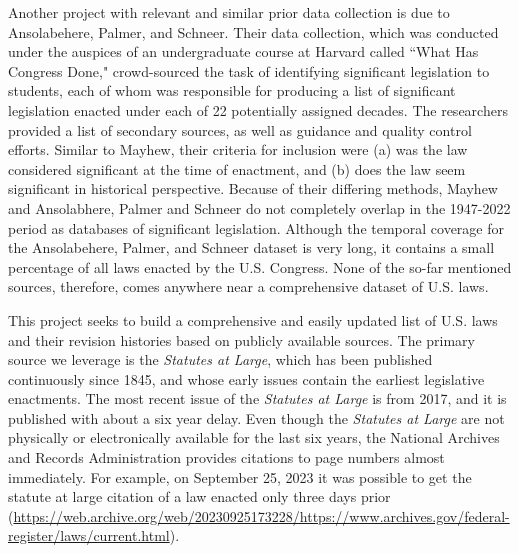 \documentclass[fleqn,10pt]{wlscirep}
\begin{document}
Another project with relevant and similar prior data collection is due to Ansolabehere, Palmer, and Schneer.\cite{ansolabehere_palmer_schneer_2016,ansolabehere2018divided} Their data collection, which was conducted under the auspices of an undergraduate course at Harvard called ``What Has Congress Done," crowd-sourced the task of identifying significant legislation to students, each of whom was responsible for producing a list of significant legislation enacted under each of 22 potentially assigned decades. The researchers provided a list of secondary sources, as well as guidance and quality control efforts. Similar to Mayhew, their criteria for inclusion were (a) was the law considered significant at the time of enactment, and (b) does the law seem significant in historical perspective. Because of their differing methods, Mayhew and Ansolabhere, Palmer and Schneer do not completely overlap in the 1947-2022 period as databases of significant legislation. Although the temporal coverage for the Ansolabehere, Palmer, and Schneer dataset is very long, it contains a small percentage of all laws enacted by the U.S. Congress. None of the so-far mentioned sources, therefore, comes anywhere near a comprehensive dataset of U.S. laws. 


This project seeks to build a comprehensive and easily updated list of U.S. laws and their revision histories based on publicly available sources. The primary source we leverage is the \emph{Statutes at Large}, which has been published continuously since 1845, and whose early issues contain the earliest legislative enactments. The most recent issue of the \emph{Statutes at Large} is from 2017, and it is published with about a six year delay. Even though the \emph{Statutes at Large} are not physically or electronically available for the last six years, the National Archives and Records Administration provides citations to page numbers almost immediately. For example, on September 25, 2023 it was possible to get the statute at large citation of a law enacted only three days prior (\url{https://web.archive.org/web/20230925173228/https://www.archives.gov/federal-register/laws/current.html}).
\end{document}
